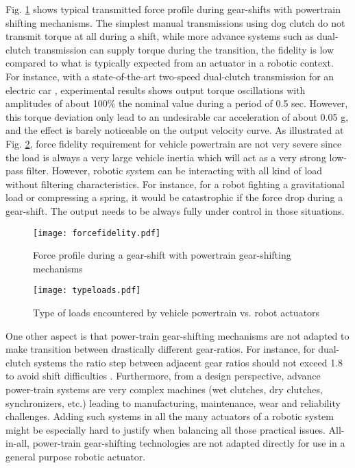 Fig. \ref{fig:forcefidelity} shows typical transmitted force profile during gear-shifts with powertrain shifting mechanisms. The simplest manual transmissions using dog clutch do not transmit torque at all during a shift, while more advance systems such as dual-clutch transmission can supply torque during the transition, the fidelity is low compared to what is typically expected from an actuator in a robotic context. For instance, with a state-of-the-art two-speed dual-clutch transmission for an electric car \cite{walker_powertrain_2017}, experimental results shows output torque oscillations with amplitudes of about 100\% the nominal value during a period of 0.5 sec. However, this torque deviation only lead to an undesirable car acceleration of about 0.05 g, and the effect is barely noticeable on the output velocity curve. As illustrated at Fig. \ref{fig:typeloads}, force fidelity requirement for vehicle powertrain are not very severe since the load is always a very large vehicle inertia which will act as a very strong low-pass filter. However, robotic system can be interacting with all kind of load without filtering characteristics. For instance, for a robot fighting a gravitational load or compressing a spring, it would be catastrophic if the force drop during a gear-shift. The output needs to be always fully under control in those situations. 

\begin{figure}[htb]
	\centering
		\texttt{[image: forcefidelity.pdf]}
	\caption{Force profile during a gear-shift with powertrain gear-shifting mechanisms}
	\label{fig:forcefidelity}
\end{figure}

\begin{figure}[htb]
	\centering
		\texttt{[image: typeloads.pdf]}
	\caption{Type of loads encountered by vehicle powertrain vs. robot actuators}
	\label{fig:typeloads}
\end{figure}

One other aspect is that power-train gear-shifting mechanisms are not adapted to make transition between drastically different gear-ratios. For instance, for dual-clutch systems the ratio step between adjacent gear ratios should not exceed 1.8 to avoid shift difficulties \cite{gao_gear_2015}. Furthermore, from a design perspective, advance power-train systems are very complex machines (wet clutches, dry clutches, synchronizers, etc.) leading to manufacturing, maintenance, wear and reliability challenges. Adding such systems in all the many actuators of a robotic system might be especially hard to justify when balancing all those practical issues. All-in-all, power-train gear-shifting technologies are not adapted directly for use in a general purpose robotic actuator.

